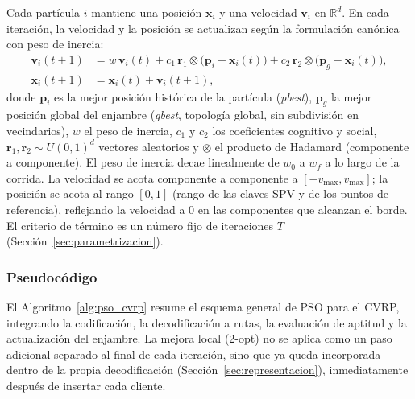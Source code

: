 Cada partícula $i$ mantiene una posición $\mathbf{x}_i$ y una velocidad $\mathbf{v}_i$
en $\mathbb{R}^{d}$. En cada iteración, la velocidad y la posición se actualizan según
la formulación canónica con peso de inercia:
\begin{align}
    \mathbf{v}_i(t{+}1) &= w\,\mathbf{v}_i(t)
        + c_1\,\mathbf{r}_1 \otimes \big(\mathbf{p}_i - \mathbf{x}_i(t)\big)
        + c_2\,\mathbf{r}_2 \otimes \big(\mathbf{p}_g - \mathbf{x}_i(t)\big),
        \label{eq:m2_velocidad}\\[2pt]
    \mathbf{x}_i(t{+}1) &= \mathbf{x}_i(t) + \mathbf{v}_i(t{+}1),
        \label{eq:m2_posicion}
\end{align}
donde $\mathbf{p}_i$ es la mejor posición histórica de la partícula (\textit{pbest}),
$\mathbf{p}_g$ la mejor posición global del enjambre (\textit{gbest}, topología global,
sin subdivisión en vecindarios), $w$ el peso de inercia, $c_1$ y $c_2$ los coeficientes
cognitivo y social, $\mathbf{r}_1, \mathbf{r}_2 \sim U(0,1)^d$ vectores aleatorios y
$\otimes$ el producto de Hadamard (componente a componente). El peso de inercia decae
linealmente de $w_0$ a $w_f$ a lo largo de la corrida. La velocidad se acota
componente a componente a $[-v_{\max}, v_{\max}]$; la posición se acota al rango
$[0,1]$ (rango de las claves SPV y de los puntos de referencia), reflejando la velocidad
a $0$ en las componentes que alcanzan el borde. El criterio de término es un número fijo
de iteraciones $T$ (Sección~\ref{sec:parametrizacion}).

\subsubsection{Pseudocódigo}

El Algoritmo~\ref{alg:pso_cvrp} resume el esquema general de PSO para el CVRP, integrando
la codificación, la decodificación a rutas, la evaluación de aptitud y la actualización del
enjambre. La mejora local (2-opt) no se aplica como un paso adicional separado al final de
cada iteración, sino que ya queda incorporada dentro de la propia decodificación
(Sección~\ref{sec:representacion}), inmediatamente después de insertar cada cliente.

